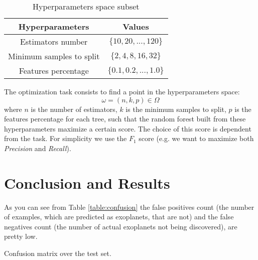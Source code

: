 \documentclass[11pt, a4paper]{article}
\begin{document}
\begin{multicols}{2}
  \begin{table}[H]
    \centering
    \begin{tabular}{|c c|}
      \hline
      Hyperparameters & Values \\
      \hline\hline
      Estimators number & $\{10,20,...,120\}$ \\
      \hline
      Minimum samples to split & $\{2,4,8,16,32\}$ \\
      \hline
      Features percentage & $\{0.1,0.2,...,1.0\}$ \\
      \hline
    \end{tabular}
    \caption{Hyperparameters space subset}
    \label{table:hyperparameters}
  \end{table}

  The optimization task consists to find a point in the hyperparameters space:
  \[\omega=(n, k, p)\in\Omega\]
  where $n$ is the number of estimators, $k$ is the minimum samples to split, $p$ is the features percentage for each tree, such that the random forest built from these hyperparameters maximize a certain score. The choice of this score is dependent from the task. For simplicity we use the $F_{1}$ score (e.g. we want to maximize both \textit{Precision} and \textit{Recall}).

\section{Conclusion and Results}
  As you can see from Table \ref{table:confusion} the false positives count (the number of examples, which are predicted as exoplanets, that are not) and the false negatives count (the number of actual exoplanets not being discovered), are pretty low.
  \begin{table}[H]
    \centering
    \caption{Confusion matrix over the test set.}
    \label{table:confusion}
  \end{table}


\end{multicols}
\end{document}
